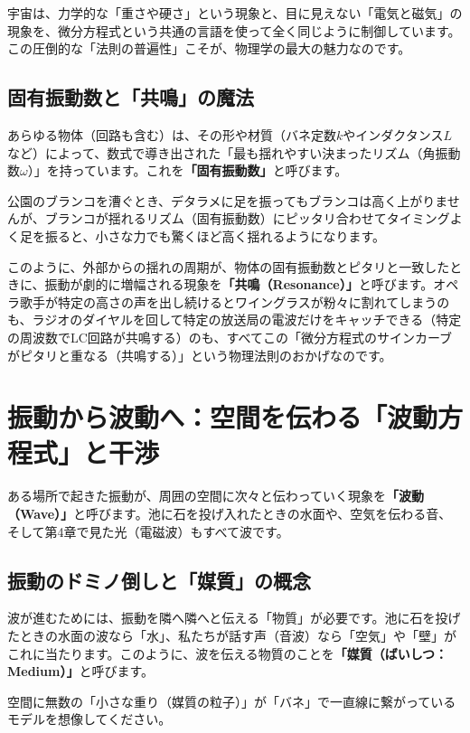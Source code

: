 宇宙は、力学的な「重さや硬さ」という現象と、目に見えない「電気と磁気」の現象を、微分方程式という共通の言語を使って全く同じように制御しています。この圧倒的な「法則の普遍性」こそが、物理学の最大の魅力なのです。

\subsection{固有振動数と「共鳴」の魔法}

あらゆる物体（回路も含む）は、その形や材質（バネ定数\(k\)やインダクタンス\(L\)など）によって、数式で導き出された「最も揺れやすい決まったリズム（角振動数\(\omega\)）」を持っています。これを\textbf{「固有振動数」}と呼びます。

公園のブランコを漕ぐとき、デタラメに足を振ってもブランコは高く上がりませんが、ブランコが揺れるリズム（固有振動数）にピッタリ合わせてタイミングよく足を振ると、小さな力でも驚くほど高く揺れるようになります。

このように、外部からの揺れの周期が、物体の固有振動数とピタリと一致したときに、振動が劇的に増幅される現象を\textbf{「共鳴（Resonance）」}と呼びます。オペラ歌手が特定の高さの声を出し続けるとワイングラスが粉々に割れてしまうのも、ラジオのダイヤルを回して特定の放送局の電波だけをキャッチできる（特定の周波数でLC回路が共鳴する）のも、すべてこの「微分方程式のサインカーブがピタリと重なる（共鳴する）」という物理法則のおかげなのです。

\section{振動から波動へ：空間を伝わる「波動方程式」と干渉}

ある場所で起きた振動が、周囲の空間に次々と伝わっていく現象を\textbf{「波動（Wave）」}と呼びます。池に石を投げ入れたときの水面や、空気を伝わる音、そして第4章で見た光（電磁波）もすべて波です。

\subsection{振動のドミノ倒しと「媒質」の概念}

波が進むためには、振動を隣へ隣へと伝える「物質」が必要です。池に石を投げたときの水面の波なら「水」、私たちが話す声（音波）なら「空気」や「壁」がこれに当たります。このように、波を伝える物質のことを\textbf{「媒質（ばいしつ：Medium）」}と呼びます。

空間に無数の「小さな重り（媒質の粒子）」が「バネ」で一直線に繋がっているモデルを想像してください。

